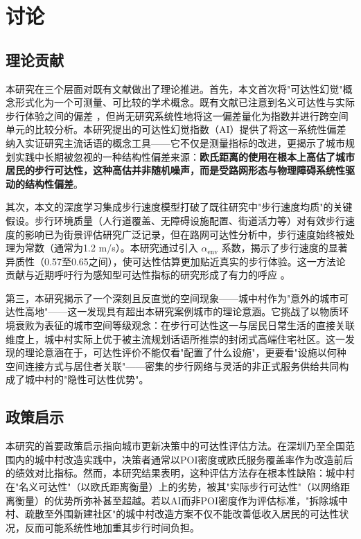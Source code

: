 \documentclass[10pt,conference]{IEEEtran}
\begin{document}
\section{讨论}
\label{sec:discussion}

\subsection{理论贡献}

本研究在三个层面对既有文献做出了理论推进。首先，本文首次将"可达性幻觉"概念形式化为一个可测量、可比较的学术概念。既有文献已注意到名义可达性与实际步行体验之间的偏差 \cite{bruno2024universal,recurrent2025}，但尚无研究系统性地将这一偏差量化为指数并进行跨空间单元的比较分析。本研究提出的可达性幻觉指数（AI）提供了将这一系统性偏差纳入实证研究主流话语的概念工具——它不仅是测量指标的改进，更揭示了城市规划实践中长期被忽视的一种结构性偏差来源：\textbf{欧氏距离的使用在根本上高估了城市居民的步行可达性，这种高估并非随机噪声，而是受路网形态与物理障碍系统性驱动的结构性偏差}。

其次，本文的深度学习集成步行速度模型打破了既往研究中"步行速度均质"的关键假设。步行环境质量（人行道覆盖、无障碍设施配置、街道活力等）对有效步行速度的影响已为街景评估研究广泛记录，但在路网可达性分析中，步行速度始终被处理为常数（通常为1.2 m/s）。本研究通过引入 $\alpha_{\text{env}}$ 系数，揭示了步行速度的显著异质性（0.57至0.65之间），使可达性估算更加贴近真实的步行体验。这一方法论贡献与近期呼吁行为感知型可达性指标的研究形成了有力的呼应 \cite{recurrent2025,geurs2004accessibility}。

第三，本研究揭示了一个深刻且反直觉的空间现象——城中村作为"意外的城市可达性高地"——这一发现具有超出本研究案例城市的理论意涵。它挑战了以物质环境衰败为表征的城市空间等级观念：在步行可达性这一与居民日常生活的直接关联维度上，城中村实际上优于被主流规划话语所推崇的封闭式高端住宅社区。这一发现的理论意涵在于，可达性评价不能仅看"配置了什么设施"，更要看"设施以何种空间连接方式与居住者关联"——密集的步行网络与灵活的非正式服务供给共同构成了城中村的"隐性可达性优势"。

\subsection{政策启示}

本研究的首要政策启示指向城市更新决策中的可达性评估方法。在深圳乃至全国范围内的城中村改造实践中，决策者通常以POI密度或欧氏服务覆盖率作为改造前后的绩效对比指标。然而，本研究结果表明，这种评估方法存在根本性缺陷：城中村在"名义可达性"（以欧氏距离衡量）上的劣势，被其"实际步行可达性"（以网络距离衡量）的优势所弥补甚至超越。若以AI而非POI密度作为评估标准，"拆除城中村、疏散至外围新建社区"的城中村改造方案不仅不能改善低收入居民的可达性状况，反而可能系统性地加重其步行时间负担。
\end{document}
